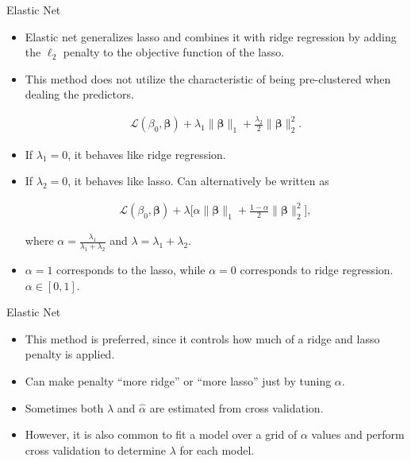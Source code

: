 \documentclass[8pt]{beamer}
\begin{document}
\begin{frame}{Elastic Net}
\begin{itemize}
    \item Elastic net generalizes lasso and combines it with ridge regression by adding the $\ell_{2}$ penalty to the objective function of the lasso. 

    \item This method does not utilize the characteristic of being pre-clustered when dealing the predictors. 

    \begin{align*}
     \mathcal{L}(\beta_{0},\bm{\beta}) + \lambda_1 \| \bm{\beta} \|_{1} + \frac{\lambda_2}{2} \|\bm{\beta}\|_{2}^{2}.
    \end{align*}
    
    \item If $\lambda_1 = 0$, it behaves like ridge regression.
    
    \item If $\lambda_{2} = 0$, it behaves like lasso. Can alternatively be written as 

    \begin{align*}
         \mathcal{L}(\beta_0, \bm{\beta})
    + \lambda \Big[ \alpha \| \bm{\beta} \|_{1} + \frac{1 - \alpha}{2} \|\bm{\beta}\|_{2}^{2} \Big],
    \end{align*}
    
where $\alpha = \frac{\lambda_1}{\lambda_1 + \lambda_2}$ and $\lambda = \lambda_1 + \lambda_2$.

    \item $\alpha = 1$ corresponds to the lasso, while $\alpha = 0$ corresponds to ridge regression. $\alpha \in [0,1]$. 

\end{itemize}    
\end{frame}

\begin{frame}{Elastic Net}
\begin{itemize}
    \item This method is preferred, since it controls how much of a ridge and lasso penalty is applied. 
    \item Can make penalty ``more ridge'' or ``more lasso'' just by tuning $\alpha$. 
    \item Sometimes both $\hat{\lambda}$ and $\hat{\alpha}$ are estimated from cross validation. 
    \item However, it is also common to fit a model over a grid of $\alpha$ values and perform cross validation to determine $\lambda$ for each model.
\end{itemize}
\end{frame}
\end{document}

